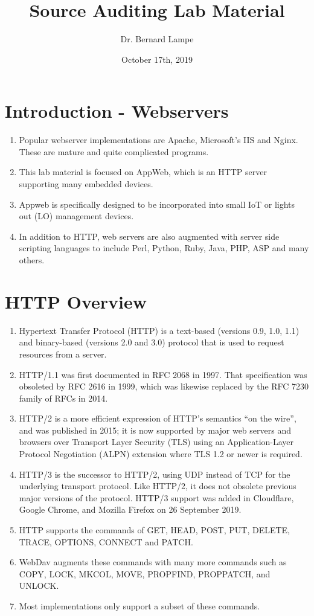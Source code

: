 \documentclass[12pt]{Training}
\title{Source Auditing Lab Material}
\author{Dr. Bernard Lampe}
\date{October 17th, 2019}
\begin{document}
\maketitle

\section*{Introduction - Webservers}
\begin{enumerate}
    \item Popular webserver implementations are Apache, Microsoft's IIS and Nginx. These are mature and quite complicated programs.
    \item This lab material is focused on AppWeb, which is an HTTP server supporting many embedded devices.
    \item Appweb is specifically designed to be incorporated into small IoT or lights out (LO) management devices.
    \item In addition to HTTP, web servers are also augmented with server side scripting languages to include Perl, Python, Ruby, Java, PHP, ASP and many others.
\end{enumerate}

\section*{HTTP Overview}
\begin{enumerate}
    \item Hypertext Transfer Protocol (HTTP) is a text-based (versions 0.9, 1.0, 1.1) and binary-based (versions 2.0 and 3.0) protocol that is used to request resources from a server.
    \item HTTP/1.1 was first documented in RFC 2068 in 1997. That specification was obsoleted by RFC 2616 in 1999, which was likewise replaced by the RFC 7230 family of RFCs in 2014.
    \item HTTP/2 is a more efficient expression of HTTP's semantics ``on the wire'', and was published in 2015; it is now supported by major web servers and browsers over Transport Layer Security (TLS) using an Application-Layer Protocol Negotiation (ALPN) extension where TLS 1.2 or newer is required.
    \item HTTP/3 is the successor to HTTP/2, using UDP instead of TCP for the underlying transport protocol. Like HTTP/2, it does not obsolete previous major versions of the protocol. HTTP/3 support was added in Cloudflare, Google Chrome, and Mozilla Firefox on 26 September 2019.
    \item HTTP supports the commands of GET, HEAD, POST, PUT, DELETE, TRACE, OPTIONS, CONNECT and PATCH.
    \item WebDav augments these commands with many more commands such as COPY, LOCK, MKCOL, MOVE, PROPFIND, PROPPATCH, and UNLOCK.
    \item Most implementations only support a subset of these commands.
\end{enumerate}
\end{document}
